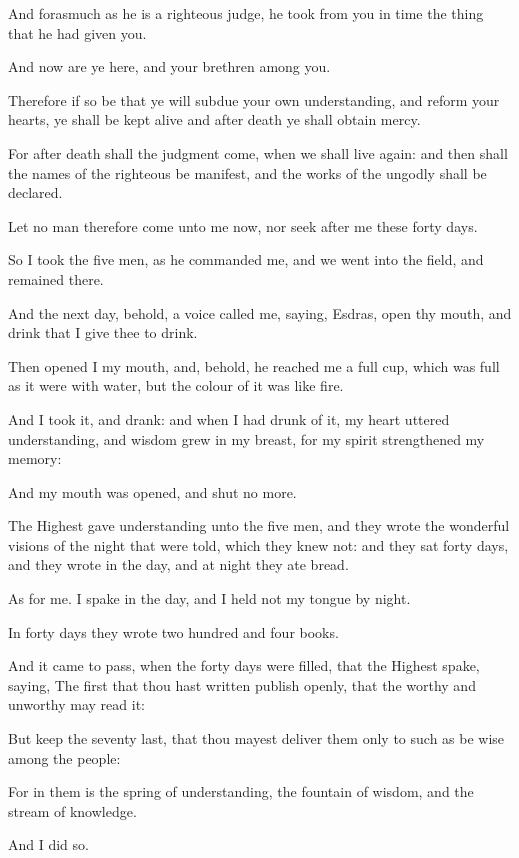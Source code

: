 {\par }{\PP {}And forasmuch as he is a righteous judge, he took from you in time the thing that he had given you.
\par }{\PP {}And now are ye here, and your brethren among you.
\par }{\PP {}Therefore if so be that ye will subdue your own understanding, and reform your hearts, ye shall be kept alive and after death ye shall obtain mercy.
\par }{\PP {}For after death shall the judgment come, when we shall live again: and then shall the names of the righteous be manifest, and the works of the ungodly shall be declared.
\par }{\PP {}Let no man therefore come unto me now, nor seek after me these forty days.
\par }{\PP {}So I took the five men, as he commanded me, and we went into the field, and remained there.
\par }{\PP {}And the next day, behold, a voice called me, saying, Esdras, open thy mouth, and drink that I give thee to drink.
\par }{\PP {}Then opened I my mouth, and, behold, he reached me a full cup, which was full as it were with water, but the colour of it was like fire.
\par }{\PP {}And I took it, and drank: and when I had drunk of it, my heart uttered understanding, and wisdom grew in my breast, for my spirit strengthened my memory:
\par }{\PP {}And my mouth was opened, and shut no more.
\par }{\PP {}The Highest gave understanding unto the five men, and they wrote the wonderful visions of the night that were told, which they knew not: and they sat forty days, and they wrote in the day, and at night they ate bread.
\par }{\PP {}As for me. I spake in the day, and I held not my tongue by night.
\par }{\PP {}In forty days they wrote two hundred and four books.
\par }{\PP {}And it came to pass, when the forty days were filled, that the Highest spake, saying, The first that thou hast written publish openly, that the worthy and unworthy may read it:
\par }{\PP {}But keep the seventy last, that thou mayest deliver them only to such as be wise among the people:
\par }{\PP {}For in them is the spring of understanding, the fountain of wisdom, and the stream of knowledge.
\par }{\PP {}And I did so.

}
